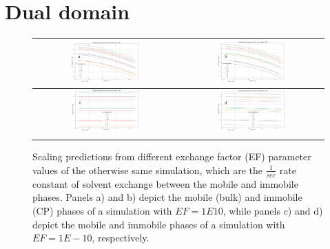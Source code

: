 \documentclass[fleqn,10pt]{wlscirep}
\begin{document}
\section{Dual domain}

\begin{figure}[h!]
    \centering
    \begin{tabular}{c|c}
        \includegraphics[width=0.49\textwidth]{images/sensitivity_analyses/EF/mobile_large_ef.png} &
        \includegraphics[width=0.49\textwidth]{images/sensitivity_analyses/EF/immobile_large_ef.png} \\ \midrule
        \includegraphics[width=0.49\textwidth]{images/sensitivity_analyses/EF/mobile_small_ef.png} & 
        \includegraphics[width=0.49\textwidth]{images/sensitivity_analyses/EF/immobile_small_ef.png} \\ \bottomrulerule
    \end{tabular}
    \caption{
        Scaling predictions from different exchange factor (EF) parameter values of the otherwise same simulation, which are the $\frac{1}{sec}$ rate constant of solvent exchange between the mobile and immobile phases. Panels a) and b) depict the mobile (bulk) and immobile (CP) phases of a simulation with $EF=1E10$, while panels c) and d) depict the mobile and immobile phases of a simulation with $EF=1E-10$, respectively.
    }
    \label{ef_values}
\end{figure}
\end{document}
